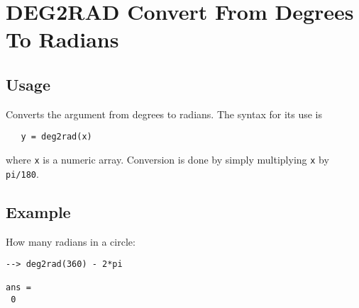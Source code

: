 \section{DEG2RAD Convert From Degrees To Radians}

\subsection{Usage}

Converts the argument from degrees to radians.  The
syntax for its use is
\begin{verbatim}
   y = deg2rad(x)
\end{verbatim}
where \verb|x| is a numeric array.  Conversion is done by
simply multiplying \verb|x| by \verb|pi/180|.
\subsection{Example}

How many radians in a circle:
\begin{verbatim}
--> deg2rad(360) - 2*pi

ans = 
 0 
\end{verbatim}
